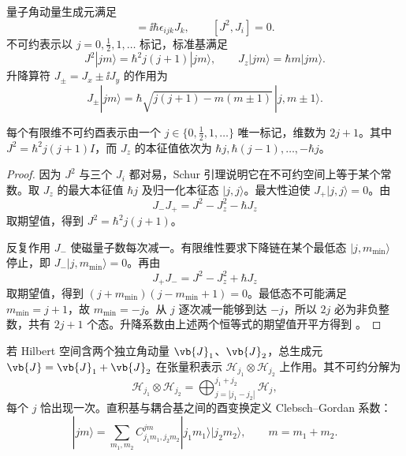 量子角动量生成元满足
\begin{equation}
[J_i,J_j]=\ii\hbar\epsilon_{ijk}J_k,
\qquad
[J^2,J_i]=0.
\label{eq:am-su2-algebra}
\end{equation}
不可约表示以 $j=0,\tfrac12,1,\ldots$ 标记，标准基满足
\[
J^2|jm\rangle=\hbar^2j(j+1)|jm\rangle,
\qquad
J_z|jm\rangle=\hbar m|jm\rangle.
\]
升降算符 $J_\pm=J_x\pm\ii J_y$ 的作用为
\begin{equation}
J_\pm|jm\rangle
=\hbar\sqrt{j(j+1)-m(m\pm1)}\,|j,m\pm1\rangle.
\label{eq:am-ladder-action}
\end{equation}

\begin{theorem}[\(SU(2)\) 有限维不可约表示]
每个有限维不可约酉表示由一个
\(j\in\{0,\tfrac12,1,\ldots\}\) 唯一标记，维数为 \(2j+1\)。其中
\(J^2=\hbar^2j(j+1)I\)，而 \(J_z\) 的本征值依次为
\(\hbar j,\hbar(j-1),\ldots,-\hbar j\)。
\end{theorem}

\begin{proof}
因为 \(J^2\) 与三个 \(J_i\) 都对易，Schur 引理说明它在不可约空间上等于某个常数。取 \(J_z\) 的最大本征值 \(\hbar j\) 及归一化本征态 \(|j,j\rangle\)。最大性迫使 \(J_+|j,j\rangle=0\)。由
\[
J_-J_+=J^2-J_z^2-\hbar J_z
\]
取期望值，得到 \(J^2=\hbar^2j(j+1)\)。

反复作用 \(J_-\) 使磁量子数每次减一。有限维性要求下降链在某个最低态 \(|j,m_{\min}\rangle\) 停止，即
\(J_-|j,m_{\min}\rangle=0\)。再由
\[
J_+J_-=J^2-J_z^2+\hbar J_z
\]
取期望值，得到
\((j+m_{\min})(j-m_{\min}+1)=0\)。最低态不可能满足
\(m_{\min}=j+1\)，故 \(m_{\min}=-j\)。从 \(j\) 逐次减一能够到达 \(-j\)，所以 \(2j\) 必为非负整数，共有 \(2j+1\) 个态。升降系数由上述两个恒等式的期望值开平方得到
。
\end{proof}

若 Hilbert 空间含两个独立角动量 $\vb{J}_1$、$\vb{J}_2$，总生成元 $\vb{J}=\vb{J}_1+\vb{J}_2$ 在张量积表示 $\mathcal H_{j_1}\otimes\mathcal H_{j_2}$ 上作用。其不可约分解为
\begin{equation}
\mathcal H_{j_1}\otimes\mathcal H_{j_2}
=\bigoplus_{j=|j_1-j_2|}^{j_1+j_2}\mathcal H_j,
\label{eq:am-cg-decomposition}
\end{equation}
每个 $j$ 恰出现一次。直积基与耦合基之间的酉变换定义 Clebsch--Gordan 系数：
\begin{equation}
|jm\rangle
=\sum_{m_1,m_2}
C^{jm}_{j_1m_1,j_2m_2}
|j_1m_1\rangle|j_2m_2\rangle,
\qquad m=m_1+m_2.
\label{eq:am-cg-definition}
\end{equation}

